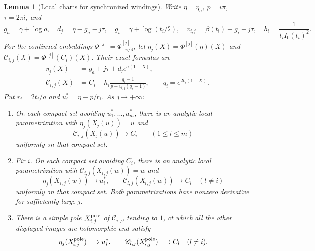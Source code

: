 \documentclass[11pt]{article}
\newtheorem{lemma}[theorem]{Lemma}
\theoremstyle{definition}
\theoremstyle{remark}
\begin{document}
\begin{lemma}[Local charts for synchronized windings]
\label{dcr:charts}
Write $\eta=\eta_a$, $p=i\pi$, $\tau=2\pi i$, and
\[
 g_a=\gamma+\log a,\quad d_j=\eta-g_a-j\tau,\quad
 g_i=\gamma+\log(t_i/2),\quad
 v_{i,j}=\beta(t_i)-g_i-j\tau,
 \quad h_i=\frac1{t_i I_0(t_i)^2}.
\]
For the continued embeddings $\Phi^{[j]}=\Phi_{-\pi/4}^{[j]}$, let
$\eta_j(X)=\Phi^{[j]}(\eta)(X)$ and
$\mathscr C_{i,j}(X)=\Phi^{[j]}(C_i)(X)$. Their exact formulas are
\begin{align}
 \eta_j(X)&=g_a+j\tau+d_j e^{a(1-X)},\label{dcr:eta-image}\\
 \mathscr C_{i,j}(X)
 &=C_i-h_i\frac{q_i-1}{p+v_{i,j}(q_i-1)},
 \qquad q_i=e^{2t_i(1-X)}.\label{dcr:C-image}
\end{align}
Put $r_i=2t_i/a$ and $u_i^*=\eta-p/r_i$. As $j\to+\infty$:
\begin{enumerate}
\item On each compact set avoiding $u_1^*,\ldots,u_m^*$, there is
an analytic local parametrization with $\eta_j(X_j(u))=u$ and
\[
 \mathscr C_{i,j}(X_j(u))\longrightarrow C_i\qquad(1\le i\le m)
\]
uniformly on that compact set.
\item Fix $i$. On each compact set avoiding $C_i$, there is an
analytic local parametrization with
$\mathscr C_{i,j}(X_{i,j}(w))=w$ and
\[
 \eta_j(X_{i,j}(w))\longrightarrow u_i^*,\qquad
 \mathscr C_{l,j}(X_{i,j}(w))\longrightarrow C_l\quad(l\ne i)
\]
uniformly on that compact set. Both parametrizations have nonzero
derivative for sufficiently large $j$.
\item There is a simple pole $X_{i,j}^{\rm pole}$ of
$\mathscr C_{i,j}$, tending to $1$, at which all the other displayed
images are holomorphic and satisfy
\[
 \eta_j(X_{i,j}^{\rm pole})\longrightarrow u_i^*,\qquad
 \mathscr C_{l,j}(X_{i,j}^{\rm pole})\longrightarrow C_l
 \quad(l\ne i).
\]
\end{enumerate}
\end{lemma}
\end{document}
